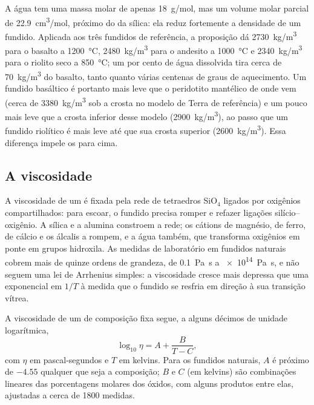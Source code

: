 A água tem uma massa molar de apenas \qty{18}{g/mol}, mas um volume molar parcial de
\qty{22.9}{cm^3/mol}, próximo do da sílica: ela reduz fortemente a densidade de um
fundido. Aplicada aos três fundidos de referência, a proposição dá
\qty{2730}{kg/m^3} para o basalto a \qty{1200}{\celsius}, \qty{2480}{kg/m^3} para
o andesito a \qty{1000}{\celsius} e \qty{2340}{kg/m^3} para o riolito seco
a \qty{850}{\celsius}; um por cento de água dissolvida tira cerca de
\qty{70}{kg/m^3} do basalto, tanto quanto várias centenas de graus de aquecimento.
Um fundido basáltico é portanto mais leve que o peridotito mantélico de onde vem
(cerca de \qty{3380}{kg/m^3} sob a crosta no modelo de Terra de referência) e um
pouco mais leve que a crosta inferior desse modelo (\qty{2900}{kg/m^3}), ao passo que um
fundido riolítico é mais leve até que sua crosta superior (\qty{2600}{kg/m^3}). Essa diferença impele os 
para cima.

\subsection{A viscosidade}

A viscosidade de um  é fixada pela rede de tetraedros SiO$_4$
ligados por oxigênios compartilhados: para escoar, o fundido precisa romper e refazer
ligações silício--oxigênio. A sílica e a alumina constroem a rede; os cátions de
magnésio, de ferro, de cálcio e os álcalis a rompem, e a água também, que
transforma oxigênios em ponte em grupos hidroxila. As medidas de laboratório em fundidos
naturais cobrem mais de quinze ordens de grandeza, de \qty{0.1}{Pa.s} a
\qty{e14}{Pa.s}, e não seguem uma lei de Arrhenius simples: a viscosidade
cresce mais depressa que uma exponencial em $1/T$ à medida que o fundido se resfria em direção à sua transição
vítrea.

\begin{proposition}\label{prop:b2:magma-emplacement:vft}
A viscosidade de um  de composição fixa segue, a alguns
décimos de unidade logarítmica,
\[
\log_{10}\eta = A + \frac{B}{T - C},
\]
com $\eta$ em pascal-segundos e $T$ em kelvins. Para os fundidos naturais, $A$ é próximo
de $-4.55$ qualquer que seja a composição; $B$ e $C$ (em kelvins) são combinações
lineares das porcentagens molares dos óxidos, com alguns produtos entre elas,
ajustadas a cerca de \num{1800} medidas.
\end{proposition}
\admitted

